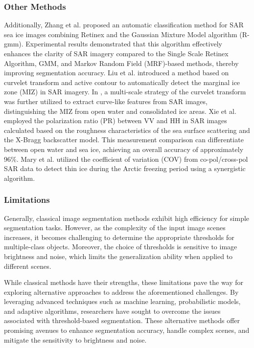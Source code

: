 \subsubsection {Other Methods}
Additionally, Zhang et al. \cite{11zhang2018automatic} proposed an automatic classification method for SAR sea ice images combining Retinex and the Gaussian Mixture Model algorithm (R-gmm). Experimental results demonstrated that this algorithm effectively enhances the clarity of SAR imagery compared to the Single Scale Retinex Algorithm, GMM, and Markov Random Field (MRF)-based methods, thereby improving segmentation accuracy. Liu et al. \cite{7liu2016automatic} introduced a method based on curvelet transform and active contour to automatically detect the marginal ice zone (MIZ) in SAR imagery. In \cite{12liu2019detection}, a multi-scale strategy of the curvelet transform was further utilized to extract curve-like features from SAR images, distinguishing the MIZ from open water and consolidated ice areas. Xie et al. \cite{13xie2020discrimination} employed the polarization ratio (PR) between VV and HH in SAR images calculated based on the roughness characteristics of the sea surface scattering and the X-Bragg backscatter model. This measurement comparison can differentiate between open water and sea ice, achieving an overall accuracy of approximately 96\%. Mary et al. \cite{14keller2020active} utilized the coefficient of variation (COV) from co-pol/cross-pol SAR data to detect thin ice during the Arctic freezing period using a synergistic algorithm.

\subsubsection {Limitations}

Generally, classical image segmentation methods exhibit high efficiency for simple segmentation tasks. However, as the complexity of the input image scenes increases, it becomes challenging to determine the appropriate thresholds for multiple-class objects. Moreover, the choice of thresholds is sensitive to image brightness and noise, which limits the generalization ability when applied to different scenes.

While classical methods have their strengths, these limitations pave the way for exploring alternative approaches to address the aforementioned challenges. By leveraging advanced techniques such as machine learning, probabilistic models, and adaptive algorithms, researchers have sought to overcome the issues associated with threshold-based segmentation. These alternative methods offer promising avenues to enhance segmentation accuracy, handle complex scenes, and mitigate the sensitivity to brightness and noise.


